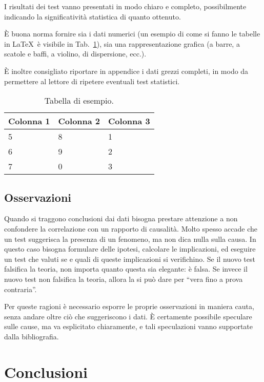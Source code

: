 \documentclass[12pt]{report}
\begin{document}
I risultati dei test vanno presentati in modo chiaro e completo, possibilmente indicando la significatività statistica di quanto ottenuto.

\`E buona norma fornire sia i dati numerici (un esempio di come si fanno le tabelle in \LaTeX\  è visibile in Tab.\ \ref{tab:sample}), sia una rappresentazione grafica (a barre, a scatole e baffi, a violino, di dispersione, ecc.).

\`E inoltre consigliato riportare in appendice i dati grezzi completi, in modo da permettere al lettore di ripetere eventuali test statistici.

\begin{table}
    \centering
    \begin{tabular}{|l|l|l|}
    \hline
    Colonna 1 & Colonna 2 & Colonna 3 \\ \hline
    5         & 8         & 1         \\
    6         & 9         & 2         \\
    7         & 0         & 3         \\ \hline
\end{tabular}
    \caption{Tabella di esempio.}
    \label{tab:sample}
\end{table}

\section{Osservazioni}

Quando si traggono conclusioni dai dati bisogna prestare attenzione a non confondere la correlazione con un rapporto di causalità. Molto spesso accade che un test suggerisca la presenza di un fenomeno, ma non dica nulla sulla causa. In questo caso bisogna formulare delle ipotesi, calcolare le implicazioni, ed eseguire un test che valuti se e quali di queste implicazioni si verifichino. Se il nuovo test falsifica la teoria, non importa quanto questa sia elegante: è falsa. Se invece il nuovo test non falsifica la teoria, allora la si può dare per ``vera fino a prova contraria''.

Per queste ragioni è necessario esporre le proprie osservazioni in maniera cauta, senza andare oltre ciò che suggeriscono i dati. \`E certamente possibile speculare sulle cause, ma va esplicitato chiaramente, e tali speculazioni vanno supportate dalla bibliografia.

%
%

\chapter{Conclusioni}
\label{cap6}
\end{document}
